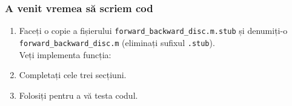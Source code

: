\begin{frame}
  \frametitle{A venit vremea să scriem cod}
  \begin{enumerate}
  \item Faceți o copie a fișierului \texttt{forward\_backward\_disc.m.stub} 
    și denumiți-o \texttt{forward\_backward\_disc.m} (eliminați sufixul \texttt{.stub}).
    \\Veți implementa funcția:\\
    \pause
  \item Completați cele trei secțiuni.%
    \vspace*{-.5em}
    
\item Folosiți  pentru a vă testa codul.
\end{enumerate}
\end{frame}
